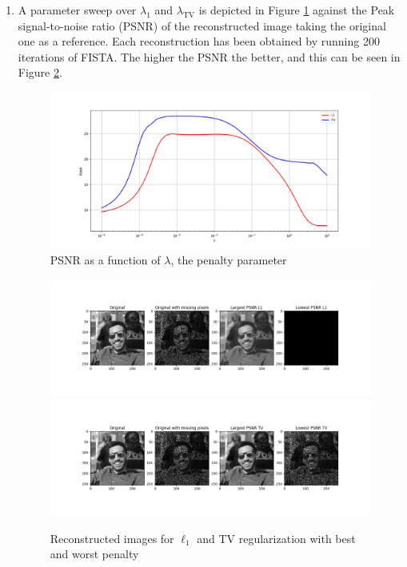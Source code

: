\documentclass{article}
\begin{document}
\begin{enumerate}[label=2.\arabic*]
    \item 
    A parameter sweep over $\lambda_1$ and $\lambda_{\text{TV}}$ is depicted in Figure \ref{fig:lambda} against the Peak signal-to-noise ratio (PSNR) of the reconstructed image taking the original one as a reference. Each reconstruction has been obtained by running 200 iterations of FISTA. The higher the PSNR the better, and this can be seen in Figure \ref{fig:psnr_tv}.
    
    \begin{figure}[H]
        \centering
        \includegraphics[trim={3cm 0.5cm 3cm 2cm},clip, width=.6\textwidth]{img/lambda_sweep.png}
        \caption{PSNR as a function of $\lambda$, the penalty parameter}
        \label{fig:lambda}
    \end{figure}
    
    \begin{figure}[H]
        \centering
        \includegraphics[trim={3.5cm 2cm 3cm 2.8cm},clip,width=\textwidth]{img/psnr_l1.png}
        \includegraphics[trim={3.5cm 2cm 3cm 2.8cm},clip,width=\textwidth]{img/psnr_tv.png}
        \caption{Reconstructed images for $\ell_1$ and TV regularization with best and worst penalty}
        \label{fig:psnr_tv}
    \end{figure}
    

\end{enumerate}
\end{document}

